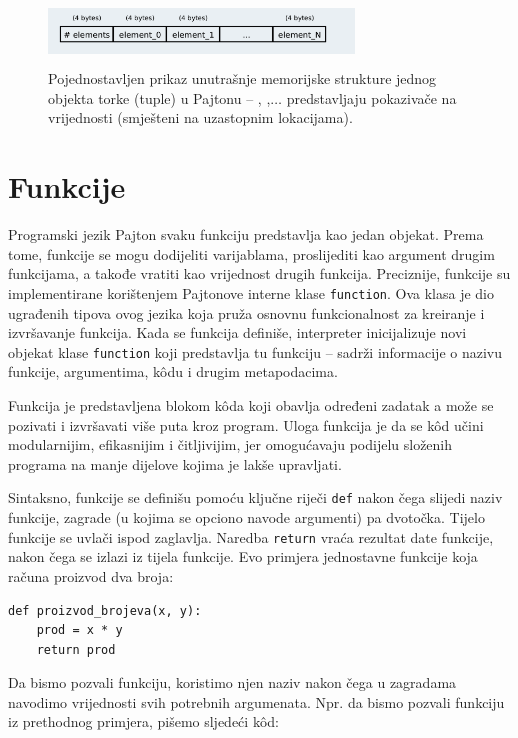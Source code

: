  	\begin{figure}
 	\centering
 	\includegraphics[width=230pt,height=50pt]{slike/tupel_mem_organization.png}
 	\caption{Pojednostavljen prikaz unutrašnje memorijske strukture jednog objekta torke (tuple) u Pajtonu -- , ,$\ldots$ predstavljaju pokazivače na vrijednosti  (smješteni na uzastopnim lokacijama). }
 \end{figure}

\section{Funkcije}

Programski jezik Pajton svaku funkciju predstavlja kao jedan objekat. Prema tome, funkcije se mogu dodijeliti varijablama, proslijediti kao argument  drugim funkcijama, a takođe vratiti kao vrijednost    drugih funkcija.  Preciznije, funkcije su implementirane korištenjem Pajtonove interne klase  \texttt{function}. Ova klasa je dio ugrađenih tipova ovog jezika koja pruža osnovnu funkcionalnost za kreiranje i izvršavanje funkcija. Kada se funkcija definiše, interpreter inicijalizuje novi objekat klase \texttt{function} koji predstavlja tu funkciju -- sadrži informacije o nazivu funkcije, argumentima, k\^odu i drugim metapodacima.

Funkcija je predstavljena blokom k\^oda koji obavlja određeni zadatak a može se pozivati i izvršavati više puta kroz program. Uloga funkcija je da se k\^od učini modularnijim, efikasnijim i čitljivijim, jer omogućavaju  podijelu složenih programa na manje dijelove kojima je lakše upravljati.

Sintaksno, funkcije se definišu pomoću ključne riječi \texttt{def} nakon čega slijedi naziv funkcije, zagrade (u kojima se opciono navode argumenti) pa dvotočka. Tijelo funkcije se uvlači ispod zaglavlja. Naredba \texttt{return} vraća rezultat date funkcije, nakon čega se izlazi iz tijela funkcije. Evo primjera jednostavne funkcije koja računa proizvod dva broja:

\begin{verbatim}
def proizvod_brojeva(x, y):
    prod = x * y
    return prod
\end{verbatim}

Da bismo pozvali funkciju, koristimo njen naziv nakon čega u zagradama navodimo vrijednosti svih potrebnih argumenata. Npr. da bismo pozvali funkciju iz prethodnog primjera, pišemo sljedeći k\^od:

